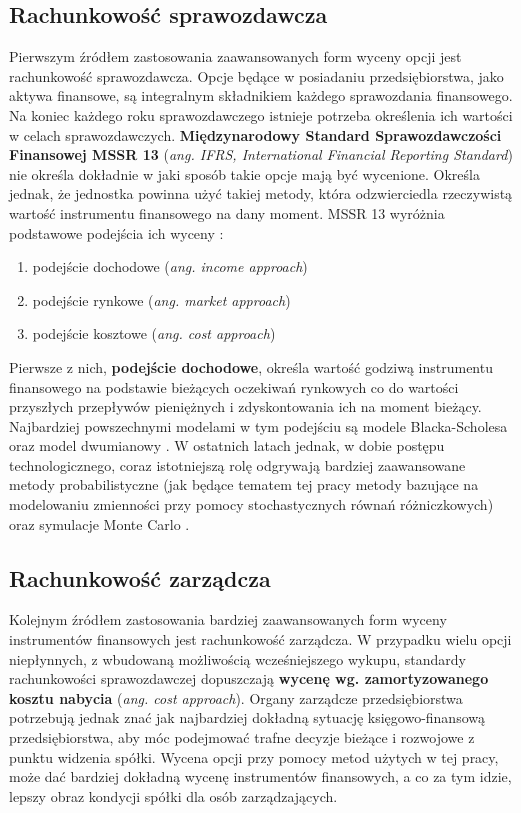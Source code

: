\documentclass{pracamgr}
\begin{document}
\subsection{Rachunkowość sprawozdawcza} %
\label{sub:rachunkowosc_sprawozdawcza}
Pierwszym źródłem zastosowania zaawansowanych form wyceny opcji jest rachunkowość sprawozdawcza.
Opcje będące w posiadaniu przedsiębiorstwa, jako aktywa finansowe, są integralnym składnikiem każdego sprawozdania finansowego. Na koniec 
każdego roku sprawozdawczego istnieje potrzeba określenia ich wartości w celach sprawozdawczych.
\textbf{Międzynarodowy Standard Sprawozdawczości Finansowej MSSR 13} (\textit{ang. IFRS, International Financial Reporting Standard}) 
nie określa dokładnie w jaki sposób takie opcje mają być wycenione. 
Określa jednak, że jednostka powinna użyć takiej metody, która odzwierciedla
rzeczywistą  wartość instrumentu finansowego na dany moment. MSSR 13 wyróżnia podstawowe podejścia ich wyceny  \cite{IFRS2013}:
\begin{enumerate}
  \item podejście dochodowe (\textit{ang. income approach})
  \item podejście rynkowe (\textit{ang. market approach})
  \item podejście kosztowe (\textit{ang. cost approach})
\end{enumerate}
Pierwsze z nich, \textbf{podejście dochodowe}, określa wartość godziwą instrumentu finansowego na podstawie bieżących oczekiwań rynkowych co do wartości 
przyszłych przepływów pieniężnych i zdyskontowania ich na moment bieżący. Najbardziej powszechnymi modelami w tym podejściu są modele Blacka-Scholesa 
oraz model dwumianowy  \cite{IFRS2013}. W ostatnich latach jednak, w dobie postępu technologicznego, coraz istotniejszą rolę odgrywają bardziej zaawansowane metody probabilistyczne
(jak będące tematem tej pracy metody bazujące na modelowaniu zmienności przy pomocy stochastycznych równań różniczkowych) oraz symulacje Monte Carlo  \cite{FairValue2010}.  


\subsection{Rachunkowość zarządcza} %
\label{sub:RachunkowoscZarzadcza}
Kolejnym źródłem zastosowania bardziej zaawansowanych form wyceny instrumentów finansowych jest rachunkowość zarządcza. 
W przypadku wielu opcji niepłynnych, z wbudowaną możliwością wcześniejszego wykupu, standardy rachunkowości sprawozdawczej dopuszczają
\textbf{wycenę wg. zamortyzowanego kosztu nabycia} (\textit{ang. cost approach}). Organy zarządcze 
przedsiębiorstwa potrzebują jednak znać jak najbardziej dokładną sytuację księgowo-finansową przedsiębiorstwa, aby móc podejmować trafne decyzje bieżące i rozwojowe z punktu widzenia spółki. 
Wycena opcji przy pomocy metod użytych w tej pracy, może dać bardziej dokładną wycenę instrumentów 
finansowych, a co za tym idzie, lepszy obraz kondycji spółki dla osób zarządzających.  
\end{document}

